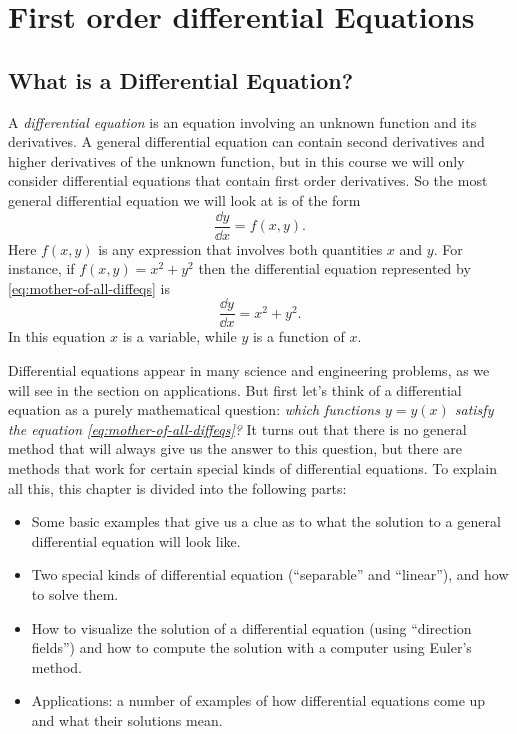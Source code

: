 \chapter{First order differential Equations}
\label{cha:diffeqs}

\section{What is a Differential Equation?} %
\label{sec:what-diffeq}
A \emph{differential equation} is an equation involving an unknown function and its
derivatives.  A general differential equation can contain second derivatives and
higher derivatives of the unknown function, but in this course we will only consider
differential equations that contain first order derivatives.  So the most general
differential equation we will look at is of the form
\begin{equation}
  \frac{\dd y}{ \dd x} = f(x, y).
  \label{eq:mother-of-all-diffeqs}
\end{equation}
Here $f(x,y)$ is any expression that involves both quantities $x$ and $y$.  For
instance, if $f(x,y) = x^2+y^2$ then the differential equation represented by
\eqref{eq:mother-of-all-diffeqs} is
\[
  \frac{\dd y}{\dd x} = x^2 + y^2.
\]
In this equation $x$ is a variable, while $y$ is a function of $x$.

Differential equations appear in many science and engineering problems, as we will
see in the section on applications.  But first let's think of a differential equation
as a purely mathematical question: \textit{which functions $y=y(x)$ satisfy the
  equation \eqref{eq:mother-of-all-diffeqs}?}  It turns out that there is no general
method that will always give us the answer to this question, but there are methods
that work for certain special kinds of differential equations.  To explain all this,
this chapter is divided into the following parts:
\begin{itemize}
\item Some basic examples that give us a clue as to what the solution to a general
  differential equation will look like.
\item Two special kinds of differential equation (``separable'' and ``linear''), and
  how to solve them.
\item How to visualize the solution of a differential equation (using ``direction
  fields'') and how to compute the solution with a computer using Euler's method.
\item Applications: a number of examples of how differential equations come up and
  what their solutions mean.
\end{itemize}

